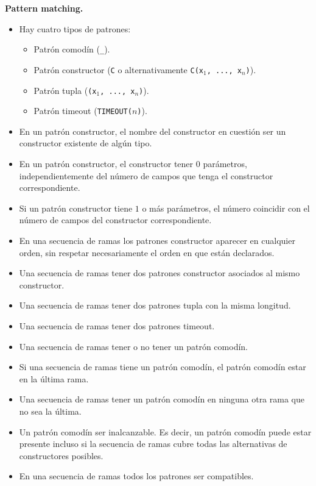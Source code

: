 \documentclass{article}
\begin{document}
{\bf Pattern matching.}
\begin{itemize}
\item Hay cuatro tipos de patrones:
  \begin{itemize}
  \item Patr\'on comod\'in (\texttt{\_}).
  \item Patr\'on constructor (\texttt{C} o alternativamente \texttt{C(x$_1$, ..., x$_n$)}).
  \item Patr\'on tupla (\texttt{(x$_1$, ..., x$_n$)}).
  \item Patr\'on timeout (\texttt{TIMEOUT($n$)}).
  \end{itemize}
\item En un patr\'on constructor, el nombre del constructor en cuesti\'on \DEBE ser un constructor existente de
      alg\'un tipo.
\item En un patr\'on constructor, el constructor \PUEDE tener $0$ par\'ametros, independientemente del n\'umero
      de campos que tenga el constructor correspondiente.
\item Si un patr\'on constructor tiene $1$ o m\'as par\'ametros, el n\'umero \DEBE coincidir con el n\'umero
      de campos del constructor correspondiente.
\item En una secuencia de ramas los patrones constructor \PUEDEN aparecer en cualquier orden, sin respetar necesariamente el orden en que est\'an declarados.
\item Una secuencia de ramas \NOPUEDE tener dos patrones constructor asociados al mismo constructor.
\item Una secuencia de ramas \NOPUEDE tener dos patrones tupla con la misma longitud.
\item Una secuencia de ramas \NOPUEDE tener dos patrones timeout.
\item Una secuencia de ramas \PUEDE tener o no tener un patr\'on comod\'in.
\item Si una secuencia de ramas tiene un patr\'on comod\'in, el patr\'on comod\'in \DEBE estar en la \'ultima rama.
\item Una secuencia de ramas \NOPUEDE tener un patr\'on comod\'in en ninguna otra rama que no sea la \'ultima.
\item Un patr\'on comod\'in \PUEDE ser inalcanzable.
      Es decir, un patr\'on comod\'in puede estar presente incluso si la secuencia de ramas
      cubre todas las alternativas de constructores posibles.
\item En una secuencia de ramas todos los patrones \DEBEN ser compatibles.

\end{itemize}
\end{document}
